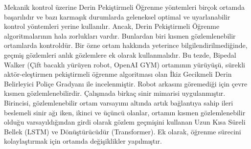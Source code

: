 Mekanik kontrol üzerine Derin Pekiştirmeli Öğrenme yöntemleri birçok ortamda başarılıdır ve bazı karmaşık durumlarda geleneksel optimal ve uyarlanabilir kontrol yöntemleri yerine kullanılır. 
Ancak, Derin Pekiştirmeli Öğrenme algoritmalarının hala zorlukları vardır. 
Bunlardan biri kısmen gözlemlenebilir ortamlarda kontroldür. 
Bir özne ortam hakkında yeterince bilgilendirilmediğinde, geçmiş gözlemleri anlık gözlemlere ek olarak kullanmalıdır. 
Bu tezde, Bipedal Walker (Çift bacaklı yürüyen robot, OpenAI GYM) ortamının yürüyüşü, sürekli aktör-eleştirmen pekiştirmeli öğrenme algoritması olan İkiz Gecikmeli Derin Belirleyici Poliçe Gradyanı ile incelenmiştir. 
Robot arkasını göremediği için çevre kısmen gözlemlenebilirdir. 
Çalışmada birkaç sinir mimarisi uygulanmıştır. 
Birincisi, gözlemlenebilir ortam varsayımı altında artık bağlantıya sahip ileri beslemeli sinir ağı iken, ikinci ve üçüncü olanlar, 
ortamın kısmen gözlemlenebilir olduğu varsayıldığından girdi olarak gözlem geçmişini kullanan Uzun Kısa Süreli Bellek (LSTM) ve Dönüştürücüdür (Transformer). 
Ek olarak, öğrenme sürecini kolaylaştırmak için ortamda değişiklikler yapılmıştır. 